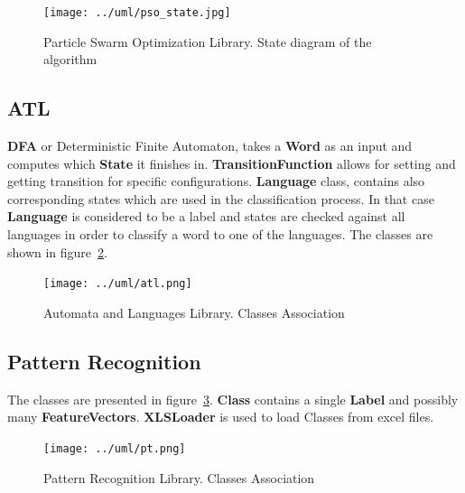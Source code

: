 \documentclass{mini}
\begin{document}
\begin{figure}[H]
    \centering
    \texttt{[image: ../uml/pso\_state.jpg]}
    \caption{Particle Swarm Optimization Library. State diagram of the algorithm }
    \label{fig:lib_pso_states}
\end{figure}


\subsection{ATL}

{\bf DFA} or Deterministic Finite Automaton, takes a {\bf Word} as an input and computes which {\bf State} it finishes in. {\bf TransitionFunction} allows for setting and getting transition for specific configurations. {\bf Language} class, contains also corresponding states which are used in the classification process. In that case {\bf Language} is considered to be a label and states are checked against all languages in order to classify a word to one of the languages. The classes are shown in figure~\ref{fig:lib_atl}.


\begin{figure}[H]
    \centering
    \texttt{[image: ../uml/atl.png]}
    \caption{Automata and Languages Library. Classes Association}
    \label{fig:lib_atl}
\end{figure}


\subsection{Pattern Recognition}

The classes are presented in figure~\ref{fig:lib_pt}. {\bf Class} contains a single {\bf Label} and possibly many {\bf FeatureVectors}. {\bf XLSLoader} is used to load Classes from excel files.

\begin{figure}[H]
    \centering
    \texttt{[image: ../uml/pt.png]}
    \caption{Pattern Recognition Library. Classes Association}
    \label{fig:lib_pt}
\end{figure}
 
\end{document}

